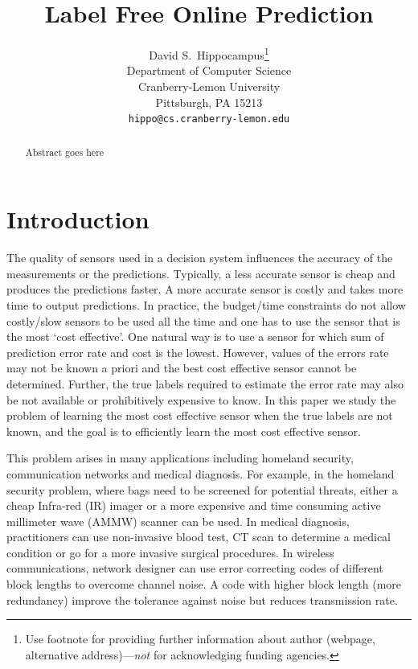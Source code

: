 \documentclass{article}
\title{Label Free Online Prediction}
\author{
	David S.~Hippocampus\thanks{Use footnote for providing further
		information about author (webpage, alternative
		address)---\emph{not} for acknowledging funding agencies.} \\
	Department of Computer Science\\
	Cranberry-Lemon University\\
	Pittsburgh, PA 15213 \\
	\texttt{hippo@cs.cranberry-lemon.edu} \\
}
\begin{document}
	
	\maketitle
	
	\begin{abstract}
		Abstract goes here
	\end{abstract}

\section{Introduction}
The quality of sensors used in a decision system influences the accuracy of  the measurements or the predictions. Typically, a less accurate sensor is cheap and produces the predictions faster. A more accurate sensor is costly and takes more time to output predictions. In practice, the budget/time constraints do not allow costly/slow sensors to be used all the time and one has to use the sensor that is the most `cost effective'. One natural way is to use a sensor for which sum of prediction error rate and cost is the lowest. However,  values of the errors rate may not be known a priori and the best cost effective sensor cannot be determined. Further, the true labels required to estimate the error rate may also be not available or prohibitively expensive to know. In this paper we study the problem of learning the most cost effective sensor when the true labels are not known, and the goal is to efficiently learn the most cost effective sensor. 

This problem arises in many applications including homeland security, communication networks and medical diagnosis. For example, in the homeland security problem, where bags need to be screened for potential threats, either a cheap Infra-red (IR) imager or a more expensive and time consuming active millimeter wave (AMMW) scanner can be used. In medical diagnosis, practitioners can use non-invasive blood test, CT scan to determine a medical condition or go for a more invasive surgical procedures. In wireless communications, network designer can use error correcting codes of different block lengths to overcome channel noise. A code with higher block length (more redundancy)  improve the tolerance against noise but reduces transmission rate. 
     
\end{document}
